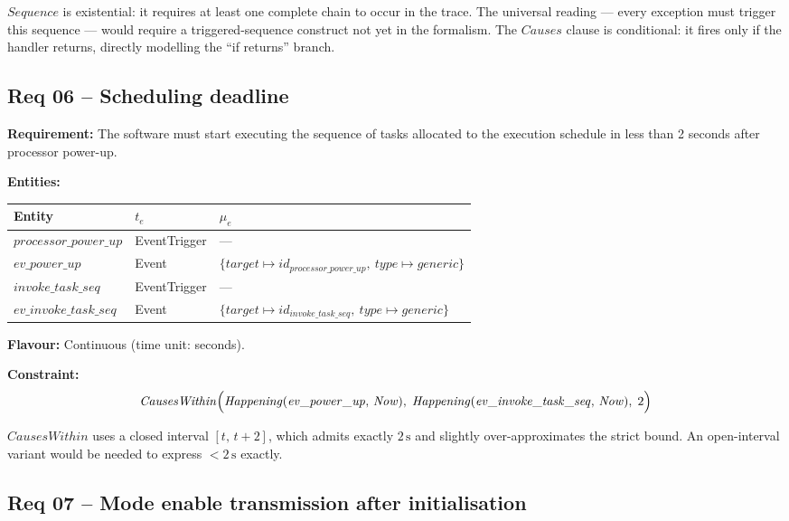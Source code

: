 $\mathit{Sequence}$ is existential: it requires at least one complete chain to occur in the trace.
The universal reading --- every exception must trigger this sequence --- would require a triggered-sequence construct not yet in the formalism.
The $\mathit{Causes}$ clause is conditional: it fires only if the handler returns, directly modelling the ``if returns'' branch.

\subsection{Req 06 -- Scheduling deadline}

\textbf{Requirement:} The software must start executing the sequence of tasks allocated to the execution schedule in less than 2 seconds after processor power-up.

\medskip
\textbf{Entities:}
\begin{center}
\begin{tabular}{lll}
    \toprule
    \textbf{Entity} & $t_e$ & $\mu_e$ \\
    \midrule
    $\mathit{processor\_power\_up}$ & EventTrigger & --- \\
    $\mathit{ev\_power\_up}$ & Event & $\{\mathit{target} \mapsto id_{\mathit{processor\_power\_up}},\ \mathit{type} \mapsto \mathit{generic}\}$ \\
    $\mathit{invoke\_task\_seq}$ & EventTrigger & --- \\
    $\mathit{ev\_invoke\_task\_seq}$ & Event & $\{\mathit{target} \mapsto id_{\mathit{invoke\_task\_seq}},\ \mathit{type} \mapsto \mathit{generic}\}$ \\
    \bottomrule
\end{tabular}
\end{center}

\textbf{Flavour:} Continuous (time unit: seconds).

\textbf{Constraint:}
\[
    \mathit{CausesWithin}\Bigl(
        \mathit{Happening}(\mathit{ev\_power\_up},\, \mathit{Now}),\;
        \mathit{Happening}(\mathit{ev\_invoke\_task\_seq},\, \mathit{Now}),\;
        2
    \Bigr)
\]

$\mathit{CausesWithin}$ uses a closed interval $[t,\, t+2]$, which admits exactly $2\,\text{s}$ and slightly over-approximates the strict bound.
An open-interval variant would be needed to express $< 2\,\text{s}$ exactly.

\subsection{Req 07 -- Mode enable transmission after initialisation}

